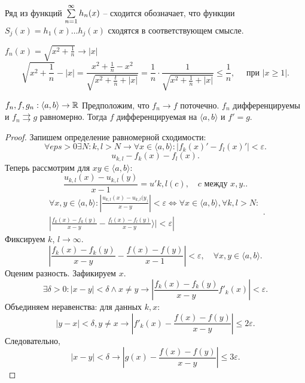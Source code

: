 \documentclass[11pt]{book}
\begin{document}
\begin{name}
    Ряд из функций $\sum\limits_{n=1}^{\infty} h_n(x)$ -- сходится обозначает, что функции $S_j(x) = h_1(x) \ldots  h_j(x)$  сходятся в соответствующем смысле.
\end{name}
\begin{ex}
    $f_n(x) = \sqrt{x^2 + \frac{1}{n}} \to  |x|$
    \[
	\sqrt{x^2 + \frac{1}{n} }- |x| = \frac{x^2 + \frac{1}{n}  - x^2}{\sqrt{x^2 + \frac{t}{n} + |x|}} = \frac{1}{n }\cdot \frac{1}{\sqrt{x ^2 + \frac{1}{n} + |x|}} \le  \frac{1}{n}, \quad \text{ при } |x \ge  1|
    .\]
\end{ex}
\begin{thm}
    $f_n, f, g_n : \langle a, b \rangle  \to  \mathbb{R}$ Предположим, что $f_n \to  f$ поточечно.
    $f_n$ дифференцируемы и $f_n \rightrightarrows g$ равномерно. Тогда $f$  дифференцируемая на $\langle a, b \rangle$ и $f '= g$.
\end{thm}
\begin{proof}
    Запишем определение равномерной сходимости:
    \[
	\forall  eps >0 \exists  N : k, l > N \to  \forall  x \in  \langle a, b\rangle : |f_k(x) ' - f_l(x) '| < \varepsilon
    .\]
    \[
	u_{k, l} - f_k(x) - f_l(x)
    .\]
    Теперь рассмотрим для $x y \in  \langle a, b \rangle:$
    \[
	\frac{u_{k, l} (x)  - u_{k, l} (y)}{x-1} = u'{k,l}(c), \quad c \text{ между } x, y.
    .\]
    \[
	\begin{array}{r}
	    \forall x, y \in  \langle a, b \rangle : \left | \frac{u_{k, l} (x) - u_{k, l} (y_)}{x - y} \right | < \varepsilon  \Longleftrightarrow \forall  x \in  \langle a, b \rangle , \forall  k, l > N:\\
	    \left | \frac{f_k(x) - f_k(y) }{x-y} - \frac{f_l(x) - f_l(y)}{x-y} \rangle | < \varepsilon
	    \right |
	\end{array}
    .\]
    Фиксируем $k$, $l \to  \infty$.
    \[
	\left | \frac{f_k(x) - f_k(y)}{x - y} - \frac{f(x) - f(y)}{x-1} \right | < \varepsilon  , \quad \forall  x, y \in  \langle a, b \rangle
    .\]
    Оценим разность. Зафикируем $ x$.
    \[
	\exists  \delta  >0 : |x-y| < \delta  \wedge x \ne y\to  |\frac{f_k(x) - f_k(y)}{x-y} f'_k(x)|  < \varepsilon
    .\]
    Объединяем неравенства:
    для данных $ k, x$:
    \[
	|y - x| < \delta  , y \ne x \to  |f'_k(x) - \frac{f(x) - f(y)}{x-y}| \le  2 \varepsilon
    .\]
    Следовательно,
    \[
	|x - y| < \delta \to  |g(x) - \frac{f(x) - f(y)}{x-y}| \le 3 \varepsilon
    .\]
\end{proof}
\end{document}
